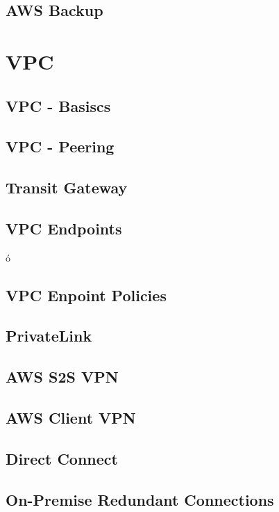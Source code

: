 \documentclass[11pt]{book}
\begin{document}
    \section{AWS Backup}


    \chapter{VPC}


    \section{VPC - Basiscs}


    \section{VPC - Peering}


    \section{Transit Gateway}


    \section{VPC Endpoints}ó


    \section{VPC Enpoint Policies}


    \section{PrivateLink}


    \section{AWS S2S VPN}


    \section{AWS Client VPN}


    \section{Direct Connect}


    \section{On-Premise Redundant Connections}
\end{document}
